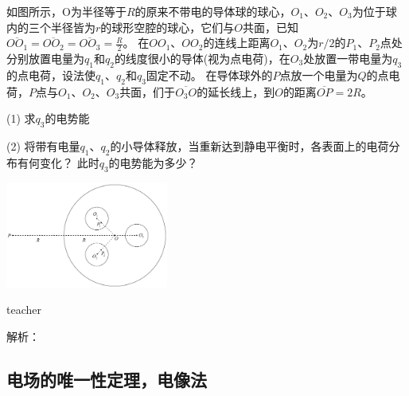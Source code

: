 \begin{example}
如图所示，O为半径等于$R$的原来不带电的导体球的球心，$O_1$、$O_2$、$O_3$为位于球内的三个半径皆为$r$的球形空腔的球心，它们与$O$共面，已知$\overline{OO_1}=\overline{OO_2}=\overline{OO_3}=\frac{R}{2}$。
在$OO_1、OO_2$的连线上距离$O_1、O_2$为$r/2$的$P_1、P_2$点处分别放置电量为$q_1$和$q_2$的线度很小的导体(视为点电荷)，在$O_3$处放置一带电量为$q_3$的点电荷，设法使$q_1、q_2$和$q_3$固定不动。
在导体球外的$P$点放一个电量为$Q$的点电荷，$P$点与$O_1、O_2、O_3$共面，们于$\overline{O_3O}$的延长线上，到$O$的距离$\overline{OP}=2R$。

(1) 求$q_3$的电势能

(2) 将带有电量$q_1、q_2$的小导体释放，当重新达到静电平衡时，各表面上的电荷分布有何变化？
此时$q_3$的电势能为多少？
\begin{flushright}
\includegraphics[width = 0.4\textwidth]{images/elec-problem-12.pdf} 
\end{flushright}
\begin{taggedblock}{teacher}

解析：
\end{taggedblock}
\end{example}

\subsection{电场的唯一性定理，电像法}


